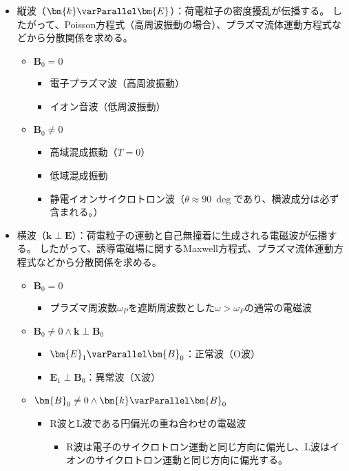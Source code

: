 \begin{itemize}
	\item 縦波（$\bm{k}\varParallel \bm{E}$）：{\color{red}荷電粒子の密度擾乱}が伝播する。
	      したがって、{\color{red}Poisson方程式}（高周波振動の場合）、{\color{red}プラズマ流体運動方程式}などから分散関係を求める。
	      \begin{itemize}
		      \item $\bm{B}_0 = 0$
		            \begin{itemize}
			            \item 電子プラズマ波（高周波振動）
			            \item イオン音波（低周波振動）
		            \end{itemize}
		      \item $\bm{B}_0 \neq 0$
		            \begin{itemize}
			            \item 高域混成振動（$T=0$）
			            \item 低域混成振動
			            \item 静電イオンサイクロトロン波（$\theta\approx \SI{90}{\deg}$であり、横波成分は必ず含まれる。）
		            \end{itemize}
	      \end{itemize}
	\item 横波（$\bm{k}\perp \bm{E}$）：{\color{red}荷電粒子の運動と自己無撞着に生成される電磁波}が伝播する。
	      したがって、{\color{red}誘導電磁場に関するMaxwell方程式}、{\color{red}プラズマ流体運動方程式}などから分散関係を求める。
	      \begin{itemize}
		      \item $\bm{B}_0 = 0$
		            \begin{itemize}
			            \item プラズマ周波数$\omega_P$を遮断周波数とした$\omega > \omega_P$の通常の電磁波
		            \end{itemize}
		      \item $\bm{B}_0 \neq 0 \wedge \bm{k}\perp \bm{B}_0$
		            \begin{itemize}
			            \item $\bm{E}_1 \varParallel \bm{B}_0$：正常波（O波）
			            \item $\bm{E}_1 \perp \bm{B}_0$：異常波（X波）
		            \end{itemize}
		      \item $\bm{B}_0 \neq 0 \wedge \bm{k}\varParallel \bm{B}_0$
		            \begin{itemize}
			            \item R波とL波である円偏光の重ね合わせの電磁波
			                  \begin{itemize}
				                  \item R波は電子のサイクロトロン運動と同じ方向に偏光し、L波はイオンのサイクロトロン運動と同じ方向に偏光する。
			                  \end{itemize}
		            \end{itemize}
	      \end{itemize}
\end{itemize}


